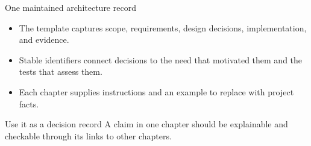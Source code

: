 \begin{frame}{One maintained architecture record}
\begin{itemize}
  \item The template captures scope, requirements, design decisions, implementation, and evidence.
  \item Stable identifiers connect decisions to the need that motivated them and the tests that assess them.
  \item Each chapter supplies instructions and an example to replace with project facts.
\end{itemize}
\begin{slidecallout}{Use it as a decision record}
A claim in one chapter should be explainable and checkable through its links to other chapters.
\end{slidecallout}
\end{frame}
